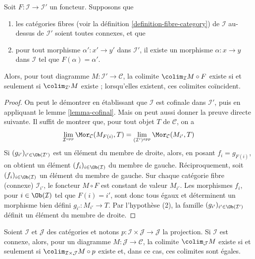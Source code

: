 \begin{lemma}
\label{lemma-colimit-constant-connected-fibers}
Soit $F : \mathcal{I} \to \mathcal{I}'$ un foncteur.
Supposons que
\begin{enumerate}
\item les catégories fibres (voir la
définition \ref{definition-fibre-category})
de $\mathcal{I}$ au-dessus de $\mathcal{I}'$ soient toutes connexes, et que
\item pour tout morphisme $\alpha' : x' \to y'$ dans $\mathcal{I}'$, il
existe un morphisme $\alpha : x \to y$ dans $\mathcal{I}$ tel que
$F(\alpha) = \alpha'$.
\end{enumerate}
Alors, pour tout diagramme $M : \mathcal{I}' \to \mathcal{C}$,
la colimite $\colim_\mathcal{I} M \circ F$ existe si et seulement si
$\colim_{\mathcal{I}'} M$ existe ; lorsqu'elles existent, ces colimites
coïncident.
\end{lemma}

\begin{proof}
On peut le démontrer en établissant que $\mathcal{I}$ est cofinale dans
$\mathcal{I}'$, puis en appliquant le lemme \ref{lemma-cofinal}.
Mais on peut aussi donner la preuve directe suivante.
Il suffit de montrer que, pour tout objet $T$ de $\mathcal{C}$, on a
$$
\lim_{\mathcal{I}^{opp}} \Mor_\mathcal{C}(M_{F(i)}, T)
=
\lim_{(\mathcal{I}')^{opp}} \Mor_\mathcal{C}(M_{i'}, T)
$$
Si $(g_{i'})_{i' \in \Ob(\mathcal{I}')}$ est un élément du
membre de droite, alors, en posant $f_i = g_{F(i)}$, on obtient un
élément $(f_i)_{i \in \Ob(\mathcal{I})}$ du membre de gauche.
Réciproquement, soit $(f_i)_{i \in \Ob(\mathcal{I})}$ un élément du
membre de gauche. Sur chaque catégorie fibre (connexe)
$\mathcal{I}_{i'}$, le foncteur $M \circ F$
est constant de valeur $M_{i'}$. Les morphismes
$f_i$, pour $i \in \Ob(\mathcal{I})$ tel que $F(i) = i'$,
sont donc tous égaux et déterminent un morphisme bien défini
$g_{i'} : M_{i'} \to T$. Par l'hypothèse (2), la famille
$(g_{i'})_{i' \in \Ob(\mathcal{I}')}$ définit un élément
du membre de droite.
\end{proof}

\begin{lemma}
\label{lemma-product-with-connected}
Soient $\mathcal{I}$ et $\mathcal{J}$ des catégories et notons
$p : \mathcal{I} \times \mathcal{J} \to \mathcal{J}$ la projection.
Si $\mathcal{I}$ est connexe, alors, pour un diagramme
$M : \mathcal{J} \to \mathcal{C}$, la colimite
$\colim_\mathcal{J} M$ existe si et seulement si
$\colim_{\mathcal{I} \times \mathcal{J}} M \circ p$ existe et,
dans ce cas, ces colimites sont égales.
\end{lemma}

